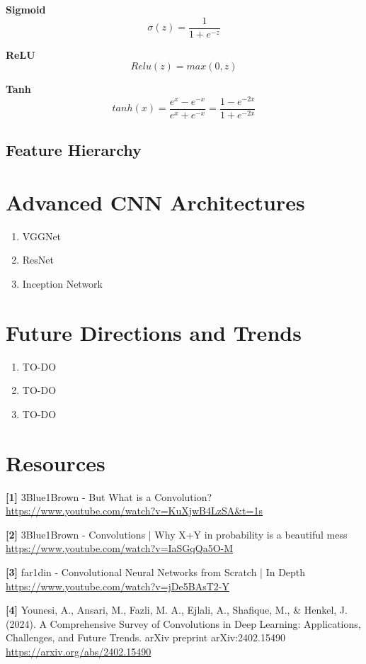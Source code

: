 \documentclass{article}
\begin{document}
        \textbf{Sigmoid}
        \[ \sigma(z) = \frac{1} {1 + e^{-z}} \]

        \textbf{ReLU}
        \[ Relu(z) = max(0, z) \]

        \textbf{Tanh}
        \[ tanh(x) = \frac{e^x - e^{-x}}{e^x + e^{-x}} = \frac{1 - e^{-2x}}{1 + e^{-2x}} \]

    \subsection{Feature Hierarchy}
    
\section{Advanced CNN Architectures}
    \begin{enumerate}[label=(\alph*)]
        \item VGGNet
        \item ResNet
        \item Inception Network
    \end{enumerate}
    
\section{Future Directions and Trends}
    \begin{enumerate}[label=(\alph*)]
        \item TO-DO
        \item TO-DO
        \item TO-DO
    \end{enumerate}

\section{Resources}
    \textbf{[1]} 3Blue1Brown - But What is a Convolution? \\
    \url{https://www.youtube.com/watch?v=KuXjwB4LzSA&t=1s}
    
    \textbf{[2]} 3Blue1Brown - Convolutions | Why X+Y in probability is a beautiful mess \\
    \url{https://www.youtube.com/watch?v=IaSGqQa5O-M}
    
    \textbf{[3]} far1din - Convolutional Neural Networks from Scratch | In Depth \\
    \url{https://www.youtube.com/watch?v=jDe5BAsT2-Y}
    
    \textbf{[4]} Younesi, A., Ansari, M., Fazli, M. A., Ejlali, A., Shafique, M., \& Henkel, J. (2024). A Comprehensive Survey of Convolutions in Deep Learning: Applications, Challenges, and Future Trends. arXiv preprint arXiv:2402.15490 \\
    \url{https://arxiv.org/abs/2402.15490}
\end{document}
